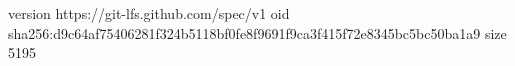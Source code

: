 version https://git-lfs.github.com/spec/v1
oid sha256:d9c64af75406281f324b5118bf0fe8f9691f9ca3f415f72e8345bc5bc50ba1a9
size 5195
